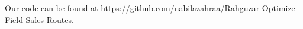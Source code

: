 

Our code can be found at \url{https://github.com/nabilazahraa/Rahguzar-Optimize-Field-Sales-Routes}.

